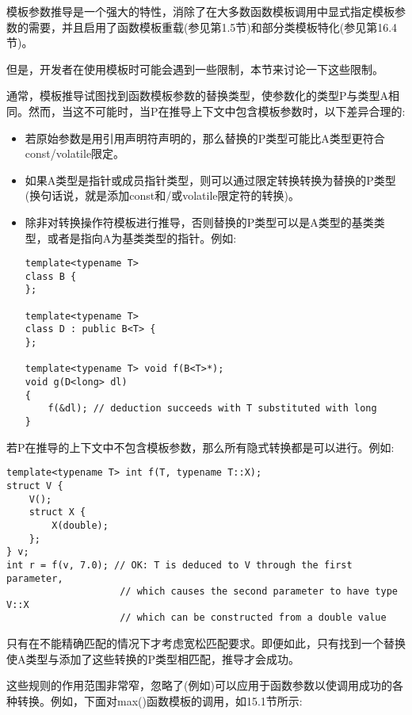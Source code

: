 

模板参数推导是一个强大的特性，消除了在大多数函数模板调用中显式指定模板参数的需要，并且启用了函数模板重载(参见第1.5节)和部分类模板特化(参见第16.4节)。

但是，开发者在使用模板时可能会遇到一些限制，本节来讨论一下这些限制。


通常，模板推导试图找到函数模板参数的替换类型，使参数化的类型P与类型A相同。然而，当这不可能时，当P在推导上下文中包含模板参数时，以下差异合理的:

\begin{itemize}
\item 
若原始参数是用引用声明符声明的，那么替换的P类型可能比A类型更符合const/volatile限定。

\item 
如果A类型是指针或成员指针类型，则可以通过限定转换转换为替换的P类型(换句话说，就是添加const和/或volatile限定符的转换)。

\item 
除非对转换操作符模板进行推导，否则替换的P类型可以是A类型的基类类型，或者是指向A为基类类型的指针。例如:

\begin{lstlisting}[style=styleCXX]
template<typename T>
class B {
};

template<typename T>
class D : public B<T> {
};

template<typename T> void f(B<T>*);
void g(D<long> dl)
{
	f(&dl); // deduction succeeds with T substituted with long
}
\end{lstlisting}
\end{itemize}

若P在推导的上下文中不包含模板参数，那么所有隐式转换都是可以进行。例如:

\begin{lstlisting}[style=styleCXX]
template<typename T> int f(T, typename T::X);
struct V {
	V();
	struct X {
		X(double);
	};
} v;
int r = f(v, 7.0); // OK: T is deduced to V through the first parameter,
					// which causes the second parameter to have type V::X
					// which can be constructed from a double value
\end{lstlisting}

只有在不能精确匹配的情况下才考虑宽松匹配要求。即便如此，只有找到一个替换使A类型与添加了这些转换的P类型相匹配，推导才会成功。

这些规则的作用范围非常窄，忽略了(例如)可以应用于函数参数以使调用成功的各种转换。例如，下面对max()函数模板的调用，如15.1节所示:

